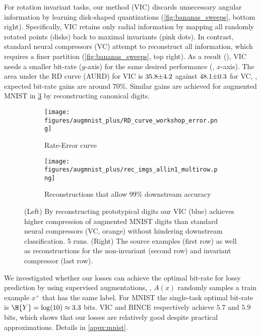 \documentclass[final]{article}
\begin{document}
For rotation invariant tasks, our method (VIC) discards unnecessary angular information by learning disk-shaped quantizations (\cref{fig:bananas_sweeps}, bottom right).
Specifically, VIC retains only radial information 
by mapping all randomly rotated points (disks) back to maximal invariants (pink dots).
In contrast, standard neural compressors (VC) attempt to reconstruct all information, which requires a finer partition (\cref{fig:bananas_sweeps}, top right).
As a result (), VIC needs a smaller bit-rate ($y$-axis) for the same desired performance (\disttextinv{}, $x$-axis).
The area under the RD curve (AURD) for VIC is $35.8 {\scriptsize \pm 4.2}$ against $48.1 {\scriptsize \pm 0.3}$ for VC, \ie, expected bit-rate gains are around $70\%$.
Similar gains are achieved for augmented MNIST in  \cref{fig:augmnist++} by reconstructing canonical digits.

\begin{figure}[h]
     \centering
     \begin{subfigure}[h]{0.31\columnwidth}
         \centering
         \texttt{[image: figures/augmnist\_plus/RD\_curve\_workshop\_error.png]}
         \vspace{-1.7em}
         \caption{Rate-Error curve}
         \label{fig:augmnist++_RD}
     \end{subfigure}
     \begin{subfigure}[h]{0.68\columnwidth}
         \centering
         \texttt{[image: figures/augmnist\_plus/rec\_imgs\_allin1\_multirow.png]}
         \vspace{-1.2em}
         \caption{Reconstructions that allow $99\%$ downstream accuracy}
         \label{fig:augmnist++_RD_rec}
     \end{subfigure}
\caption{
(Left) By reconstructing prototypical digits our VIC (blue) achieves higher compression of augmented MNIST digits than standard neural compressors (VC, orange) without hindering downstream  classification. 5 runs.
(Right) The source examples (first row) as well as reconstructions for the non-invariant (second row) and invariant compressor (last row).
}
\label{fig:augmnist++}
\vspace{-0.5em}
\end{figure} 
We investigated whether our losses can achieve the optimal bit-rate for lossy prediction by using supervised augmentations, \ie, $A(x)$ randomly samples a train example $x^+$ that has the same label.
For MNIST the single-task optimal bit-rate is $\H{Y} = \log(10) \approx 3.3$ bits. 
 VIC and BINCE respectively achieve $5.7$ and $5.9$ bits, which shows that our losses are relatively good despite practical approximations. Details in \cref{appx:mnist}.
\end{document}
